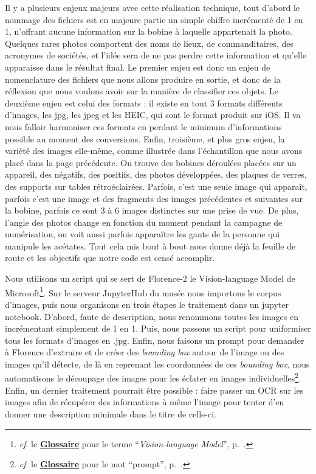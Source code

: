 Il y a plusieurs enjeux majeurs avec cette réalisation technique, tout d'abord le nommage des fichiers est en majeure partie un simple chiffre incrémenté de 1 en 1, n'offrant aucune information sur la bobine à laquelle appartenait la photo. Quelques rares photos comportent des noms de lieux, de commanditaires, des acronymes de sociétés, et l'idée sera de ne pas perdre cette information et qu'elle apparaisse dans le résultat final. Le premier enjeu est donc un enjeu de nomenclature des fichiers que nous allons produire en sortie, et donc de la réflexion que nous voulons avoir sur la manière de classifier ces objets. Le deuxième enjeu est celui des formats : il existe en tout 3 formats différents d'images, les jpg, les jpeg et les HEIC, qui sont le format produit sur iOS. Il va nous falloir harmoniser ces formats en perdant le minimum d'informations possible au moment des conversions. Enfin, troisième, et plus gros enjeu, la variété des images elle-même, comme illustrée dans l'échantillon que nous avons placé dans la page précédente. On trouve des bobines déroulées placées sur un appareil, des négatifs, des positifs, des photos développées, des plaques de verres, des supports sur tables rétroéclairées. Parfois, c'est une seule image qui apparaît, parfois c'est une image et des fragments des images précédentes et suivantes sur la bobine, parfois ce sont 3 à 6 images distinctes sur une prise de vue. De plus, l'angle des photos change en fonction du moment pendant la campagne de numérisation, on voit aussi parfois apparaître les gants de la personne qui manipule les acétates. Tout cela mis bout à bout nous donne déjà la feuille de route et les objectifs que notre code est censé accomplir.

Nous utilisons un script qui se sert de Florence-2 le Vision-language Model de Microsoft\footnote{\textit{cf}. le \textbf{\hyperref[sec:Glossaire]{Glossaire}} pour le terme \enquote{\textit{Vision-language Model}}, p.~\pageref{sec:Glossaire}.}. Sur le serveur JupyterHub du musée nous importons le corpus d'images, puis nous organisons en trois étapes le traitement dans un jupyter notebook. D'abord, faute de description, nous renommons toutes les images en incrémentant simplement de 1 en 1. Puis, nous passons un script pour uniformiser tous les formats d'images en .jpg. Enfin, nous faisons un prompt pour demander à Florence d'extraire et de créer des \textit{bounding box} autour de l'image ou des images qu'il détecte, de là en reprenant les coordonnées de ces \textit{bounding box}, nous automatisons le découpage des images pour les éclater en images individuelles\footnote{\textit{cf}. le \textbf{\hyperref[sec:Glossaire]{Glossaire}} pour le mot \enquote{prompt}, p.~\pageref{sec:Glossaire}.}. Enfin, un dernier traitement pourrait être possible : faire passer un OCR sur les images afin de récupérer des informations à même l'image pour tenter d'en donner une description minimale dans le titre de celle-ci. \hfill\break


